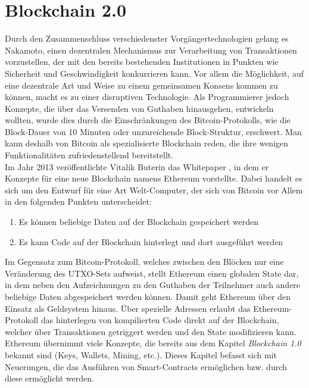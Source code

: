 \chapter{Blockchain 2.0}
Durch den Zusammenschluss verschiedenster Vorgängertechnologien gelang es Nakamoto, einen dezentralen Mechanismus zur Verarbeitung von Transaktionen vorzustellen, der mit den bereits bestehenden Institutionen in Punkten wie Sicherheit und Geschwindigkeit konkurrieren kann. Vor allem die Möglichkeit, auf eine dezentrale Art und Weise zu einem gemeinsamen Konsens kommen zu können, macht es zu einer disruptiven Technologie. Als Programmierer jedoch Konzepte, die über das Versenden von Guthaben hinausgehen, entwickeln wollten, wurde dies durch die Einschränkungen des Bitcoin-Protokolls, wie die Block-Dauer von 10 Minuten oder unzureichende Block-Struktur, erschwert. Man kann deshalb von Bitcoin als spezialisierte Blockchain reden, die ihre wenigen Funktionalitäten zufriedenstellend bereitstellt.\\
Im Jahr 2013 veröffentlichte Vitalik Buterin das Whitepaper \cite{buterin_whitepaper_2013}, in dem er Konzepte für eine neue Blockchain namens Ethereum vorstellte. Dabei handelt es sich um den Entwurf für eine Art Welt-Computer, der sich von Bitcoin vor Allem in den folgenden Punkten unterscheidet:
\begin{enumerate}
	\item Es können beliebige Daten auf der Blockchain gespeichert werden
	\item Es kann Code auf der Blockchain hinterlegt und dort ausgeführt werden
	\end{enumerate}
Im Gegensatz zum Bitcoin-Protokoll, welches zwischen den Blöcken nur eine Veränderung des UTXO-Sets aufweist, stellt Ethereum einen globalen State dar, in dem neben den Aufzeichnungen zu den Guthaben der Teilnehmer auch andere beliebige Daten abgespeichert werden können. Damit geht Ethereum über den Einsatz als Geldsystem hinaus.
Über spezielle Adressen erlaubt das Ethereum-Protokoll das hinterlegen von kompilierten Code direkt auf der Blockchain, welcher über Transaktionen getriggert werden und den State modifizieren kann. 
\\
Ethereum übernimmt viele Konzepte, die bereits aus dem Kapitel \emph{Blockchain 1.0} bekannt sind (Keys, Wallets, Mining, etc.). Dieses Kapitel befasst sich mit Neuerungen, die das Ausführen von Smart-Contracts ermöglichen bzw. durch diese ermöglicht werden.
